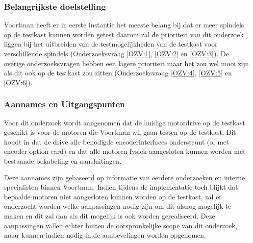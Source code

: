 \subsubsection{Belangrijkste doelstelling}

Voortman heeft er in eerste instantie het meeste belang bij dat er meer spindels op de testkast kunnen worden getest daarom zal de prioriteit van dit onderzoek liggen bij het uitbreiden van de testmogelijkheden van de testkast voor verschillende spindels (Onderzoeksvraag \ref{OZV:1}, \ref{OZV:2} en \ref{OZV:3}). De overige onderzoeksvragen hebben een lagere prioriteit maar het zou wel mooi zijn als dit ook op de testkast zou zitten (Onderzoeksvraag \ref{OZV:4}, \ref{OZV:5} en \ref{OZV:6}).

\subsubsection{Aannames en Uitgangspunten}

Voor dit onderzoek wordt aangenomen dat de huidige motordrive op de testkast geschikt is voor de motoren die Voortman wil gaan testen op de testkast. Dit houdt in dat de drive alle benodigde encoderinterfaces ondersteunt (of met encoder option card) en dat alle motoren fysiek aangesloten kunnen worden met bestaande bekabeling en aansluitingen.

\vspace{0.5cm}

Deze aannames zijn gebaseerd op informatie van eerdere onderzoeken en interne specialisten binnen Voortman. Indien tijdens de implementatie toch blijkt dat bepaalde motoren niet aangesloten kunnen worden op de testkast, zal er onderzocht worden welke aanpassingen nodig zijn om dit alsnog mogelijk te maken en dit zal dan als dit mogelijk is ook worden gerealiseerd. Deze aanpassingen vallen echter buiten de oorspronkelijke scope van dit onderzoek, maar kunnen indien nodig in de aanbevelingen worden opgenomen.

